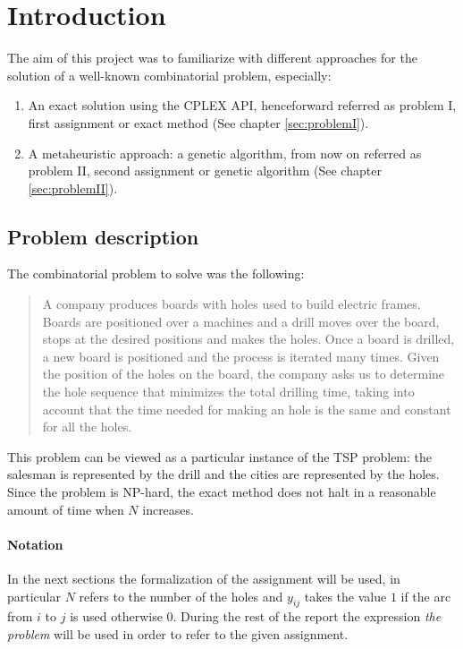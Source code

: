 
\section{Introduction}
The aim of this project was to familiarize with different approaches for the solution of a well-known combinatorial problem, especially:
\begin{enumerate}
	\item An exact solution using the CPLEX API, henceforward referred as problem I, first assignment or exact method (See chapter \ref{sec:problemI}).
	
	\item A metaheuristic approach: a genetic algorithm, from now on referred as problem II, second assignment or genetic algorithm (See chapter \ref{sec:problemII}).
\end{enumerate}
\subsection{Problem description}
\label{sec:problem}
The combinatorial problem to solve was the following:
\begin{quote}
	A company produces boards with holes used to build electric frames. Boards are positioned over a 
	machines and a drill moves over the board, stops at the desired positions
	and makes the holes. Once a board is drilled, a new board is positioned and the process is
	iterated many times. Given the position of the holes on the board, the company asks us
	to determine the hole sequence that minimizes the total drilling time, taking into account
	that the time needed for making an hole is the same and constant for all the holes.
\end{quote}
This problem can be viewed as a particular instance of the TSP problem: the salesman is represented by the 
drill and the cities are represented by the holes.
Since the problem is NP-hard, the exact method does not halt in a reasonable amount of time when $N$ increases.


\paragraph{Notation} In the next sections the formalization of the assignment will be used, in particular $N$ refers to the
number of the holes and $y_{ij}$ takes the value $1$ if the arc from $i$ to $j$
is used otherwise $0$. During the rest of the report the expression \emph{the problem} will be used in order to refer
to the given assignment.

